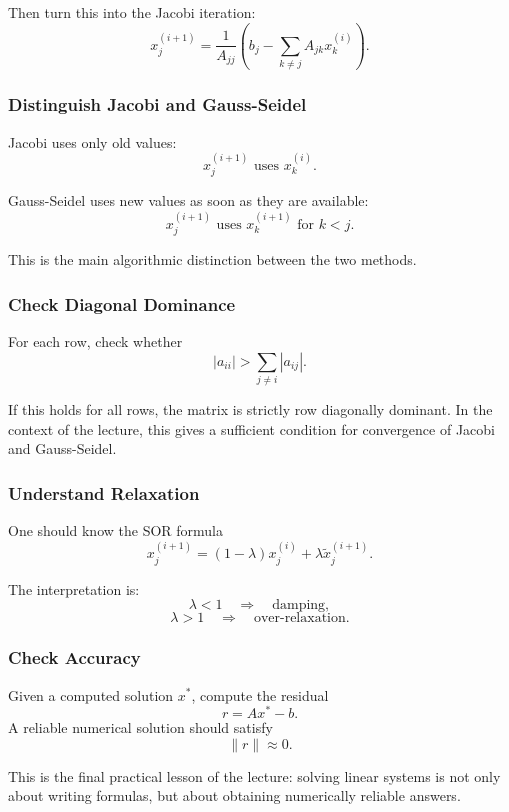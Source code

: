 \documentclass[10pt, letterpaper]{article}
\begin{document}
Then turn this into the Jacobi iteration:
\[
x_j^{(i+1)}
=
\frac{1}{A_{jj}}
\left(
b_j-\sum_{k\neq j}A_{jk}x_k^{(i)}
\right).
\]

\subsubsection{Distinguish Jacobi and Gauss-Seidel}

Jacobi uses only old values:
\[
x_j^{(i+1)}
\text{ uses } x_k^{(i)}.
\]

Gauss-Seidel uses new values as soon as they are available:
\[
x_j^{(i+1)}
\text{ uses } x_k^{(i+1)}
\text{ for } k<j.
\]

This is the main algorithmic distinction between the two methods.

\subsubsection{Check Diagonal Dominance}

For each row, check whether
\[
|a_{ii}|
>
\sum_{j\neq i}|a_{ij}|.
\]

If this holds for all rows, the matrix is strictly row diagonally dominant. In the context of the lecture, this gives a sufficient condition for convergence of Jacobi and Gauss-Seidel.

\subsubsection{Understand Relaxation}

One should know the SOR formula
\[
x_j^{(i+1)}
=
(1-\lambda)x_j^{(i)}
+
\lambda \widetilde{x}_j^{(i+1)}.
\]

The interpretation is:
\[
\lambda<1
\quad\Rightarrow\quad
\text{damping},
\]
\[
\lambda>1
\quad\Rightarrow\quad
\text{over-relaxation}.
\]

\subsubsection{Check Accuracy}

Given a computed solution \(x^\ast\), compute the residual
\[
r=Ax^\ast-b.
\]
A reliable numerical solution should satisfy
\[
\|r\|\approx 0.
\]

This is the final practical lesson of the lecture: solving linear systems is not only about writing formulas, but about obtaining numerically reliable answers.

\pagebreak
\end{document}
